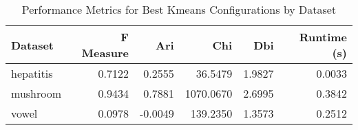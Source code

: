 \begin{table*}[ht!]
\caption{Performance Metrics for Best Kmeans Configurations by Dataset}
\label{tab:best_configs_kmeans_performance}
\begin{tabular}{lrrrrr}
Dataset & F Measure & Ari & Chi & Dbi & Runtime (s) \\\midrule

hepatitis & 0.7122 & 0.2555 & 36.5479 & 1.9827 & 0.0033 \\
mushroom & 0.9434 & 0.7881 & 1070.0670 & 2.6995 & 0.3842 \\
vowel & 0.0978 & -0.0049 & 139.2350 & 1.3573 & 0.2512 \\
\end{tabular}
\end{table*}
